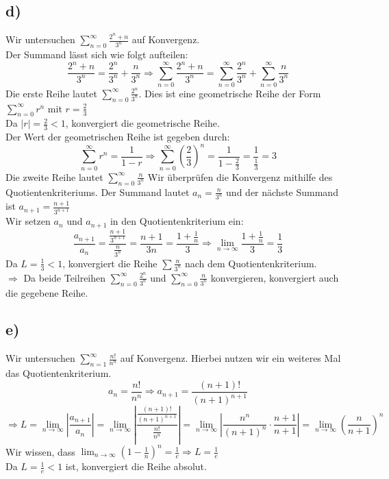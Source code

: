     \subsection{d)}
        Wir untersuchen $\sum_{n=0}^{\infty} \frac{2^n + n}{3^n}$ auf Konvergenz. \\
        Der Summand lässt sich wie folgt aufteilen:
        \[
        \frac{2^n + n}{3^n} = \frac{2^n}{3^n} + \frac{n}{3^n}\Rightarrow \sum_{n=0}^{\infty} \frac{2^n + n}{3^n} = \sum_{n=0}^{\infty} \frac{2^n}{3^n} + \sum_{n=0}^{\infty} \frac{n}{3^n}
        \]
        Die erste Reihe lautet $\sum_{n=0}^{\infty} \frac{2^n}{3^n}$. Dies ist eine geometrische Reihe der Form $\sum_{n=0}^{\infty} r^n$ mit $r = \frac{2}{3}$ \\
        Da \( |r| = \frac{2}{3} < 1 \), konvergiert die geometrische Reihe. \\
        Der Wert der geometrischen Reihe ist gegeben durch:
        \[
        \sum_{n=0}^{\infty} r^n = \frac{1}{1-r} \Rightarrow \sum_{n=0}^{\infty} \left( \frac{2}{3} \right)^n = \frac{1}{1 - \frac{2}{3}} = \frac{1}{\frac{1}{3}} = 3
        \]
        Die zweite Reihe lautet $\sum_{n=0}^{\infty} \frac{n}{3^n}$
        Wir überprüfen die Konvergenz mithilfe des Quotientenkriteriums. Der Summand lautet $a_n = \frac{n}{3^n}$ und der nächste Summand ist $a_{n+1} = \frac{n+1}{3^{n+1}}$ \\
        Wir setzen \( a_n \) und \( a_{n+1} \) in den Quotientenkriterium ein:
        \[
        \frac{a_{n+1}}{a_n} = \frac{\frac{n+1}{3^{n+1}}}{\frac{n}{3^n}} = \frac{n+1}{3n} = \frac{1+\frac{1}{n}}{3} \Rightarrow \lim_{n \to \infty} \frac{1+\frac{1}{n}}{3} = \frac{1}{3}
        \]
        Da \( L = \frac{1}{3} < 1 \), konvergiert die Reihe \( \sum \frac{n}{3^n} \) nach dem Quotientenkriterium. \\
        
        $\Rightarrow$ Da beide Teilreihen \( \sum_{n=0}^{\infty} \frac{2^n}{3^n} \) und \( \sum_{n=0}^{\infty} \frac{n}{3^n} \) konvergieren, konvergiert auch die gegebene Reihe.
        
        
    \subsection{e)}
        Wir untersuchen $ \sum_{n=1}^{\infty} \frac{n!}{n^n}$ auf Konvergenz. Hierbei nutzen wir ein weiteres Mal das Quotientenkriterium. \\
        $$a_n = \frac{n!}{n^n} \Rightarrow a_{n+1} = \frac{(n+1)!}{(n+1)^{n+1}}$$
        $$\Rightarrow L = \lim_{n \to \infty}\left|\frac{a_{n+1}}{a_n}\right|
        =\lim_{n \to \infty}\left| \frac{\frac{(n+1)!}{(n+1)^{n+1}}}{\frac{n!}{n^n}} \right| 
        = \lim_{n \to \infty}\left| \frac{n^n}{(n+1)^n} \cdot \frac{n+1}{n+1} \right|
        = \lim_{n \to \infty}\left( \frac{n}{n+1} \right)^n$$
        Wir wissen, dass $\lim_{n \to \infty}\left(1-\frac{1}{n}\right)^n=\frac{1}{e} \Rightarrow L = \frac{1}{e}$ \\
        Da $L = \frac{1}{e} < 1$ ist, konvergiert die Reihe absolut.

